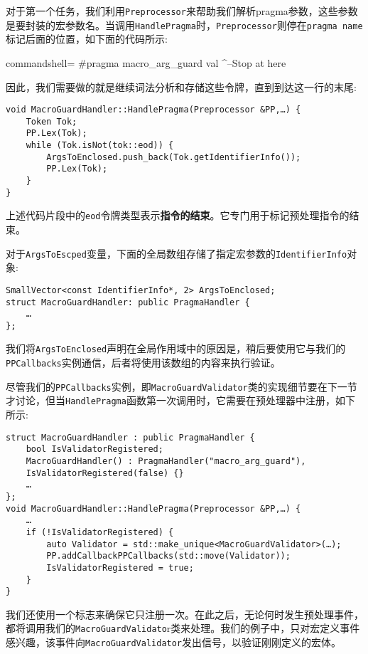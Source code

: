 对于第一个任务，我们利用\texttt{Preprocessor}来帮助我们解析pragma参数，这些参数是要封装的宏参数名。当调用\texttt{HandlePragma}时，\texttt{Preprocessor}则停在\texttt{pragma name}标记后面的位置，如下面的代码所示:

\begin{tcblisting}{commandshell={}}
#pragma macro_arg_guard val
                           ^--Stop at here
\end{tcblisting}

因此，我们需要做的就是继续词法分析和存储这些令牌，直到到达这一行的末尾:

\begin{lstlisting}[style=styleCXX]
void MacroGuardHandler::HandlePragma(Preprocessor &PP,…) {
	Token Tok;
	PP.Lex(Tok);
	while (Tok.isNot(tok::eod)) {
		ArgsToEnclosed.push_back(Tok.getIdentifierInfo());
		PP.Lex(Tok);
	}
}
\end{lstlisting}

上述代码片段中的\texttt{eod}令牌类型表示\textbf{指令的结束}。它专门用于标记预处理指令的结束。

对于\texttt{ArgsToEscped}变量，下面的全局数组存储了指定宏参数的\texttt{IdentifierInfo}对象:

\begin{lstlisting}[style=styleCXX]
SmallVector<const IdentifierInfo*, 2> ArgsToEnclosed;
struct MacroGuardHandler: public PragmaHandler {
	…
};
\end{lstlisting}

我们将\texttt{ArgsToEnclosed}声明在全局作用域中的原因是，稍后要使用它与我们的\texttt{PPCallbacks}实例通信，后者将使用该数组的内容来执行验证。

尽管我们的\texttt{PPCallbacks}实例，即\texttt{MacroGuardValidator}类的实现细节要在下一节才讨论，但当\texttt{HandlePragma}函数第一次调用时，它需要在预处理器中注册，如下所示:

\begin{lstlisting}[style=styleCXX]
struct MacroGuardHandler : public PragmaHandler {
	bool IsValidatorRegistered;
	MacroGuardHandler() : PragmaHandler("macro_arg_guard"),
	IsValidatorRegistered(false) {}
	…
};
void MacroGuardHandler::HandlePragma(Preprocessor &PP,…) {
	…
	if (!IsValidatorRegistered) {
		auto Validator = std::make_unique<MacroGuardValidator>(…);
		PP.addCallbackPPCallbacks(std::move(Validator));
		IsValidatorRegistered = true;
	}
}
\end{lstlisting}

我们还使用一个标志来确保它只注册一次。在此之后，无论何时发生预处理事件，都将调用我们的\texttt{MacroGuardValidato}r类来处理。我们的例子中，只对宏定义事件感兴趣，该事件向\texttt{MacroGuardValidator}发出信号，以验证刚刚定义的宏体。

